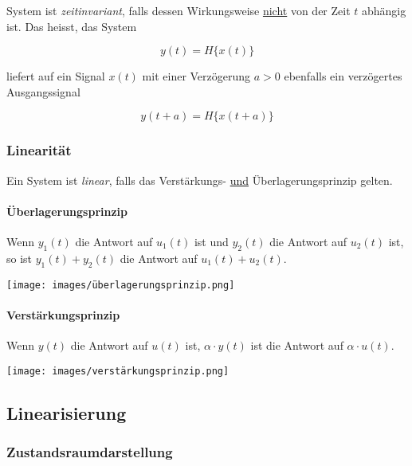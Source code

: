 \documentclass[
  10pt,
  a4paper,
  twocolumn]{article}
\let\oldparagraph\paragraph
\renewcommand{\paragraph}[1]{\oldparagraph{#1}\mbox{}}
\numberwithin{equation}{section}
\let\paragraph\oldparagraph
\renewcommand{\paragraph}[1]{\oldparagraph{#1}\mbox{}\par}
\begin{document}
System ist \emph{zeitinvariant}, falls dessen Wirkungsweise \ul{nicht}
von der Zeit \(t\) abhängig ist. Das heisst, das System

\[ y(t) = H\{x(t)\} \]

liefert auf ein Signal \(x(t)\) mit einer Verzögerung \(a>0\) ebenfalls
ein verzögertes Ausgangssignal

\[ y(t+a)=H\{x(t+a)\} \]

\subsubsection{Linearität}\label{linearituxe4t}

Ein System ist \emph{linear}, falls das Verstärkungs- \ul{und}
Überlagerungsprinzip gelten.

\paragraph{Überlagerungsprinzip}\label{uxfcberlagerungsprinzip}

Wenn \(y_1(t)\) die Antwort auf \(u_1(t)\) ist und \(y_2(t)\) die
Antwort auf \(u_2(t)\) ist, so ist \(y_1(t) + y_2(t)\) die Antwort auf
\(u_1(t) + u_2(t)\).

\begin{center}
\texttt{[image: images/überlagerungsprinzip.png]}
\end{center}

\paragraph{Verstärkungsprinzip}\label{verstuxe4rkungsprinzip}

Wenn \(y(t)\) die Antwort auf \(u(t)\) ist, \(\alpha\cdot y(t)\) ist die
Antwort auf \(\alpha\cdot u(t)\).

\begin{center}
\texttt{[image: images/verstärkungsprinzip.png]}
\end{center}

\subsection{Linearisierung}\label{linearisierung-1}

\subsubsection{Zustandsraumdarstellung}\label{zustandsraumdarstellung}
\end{document}
